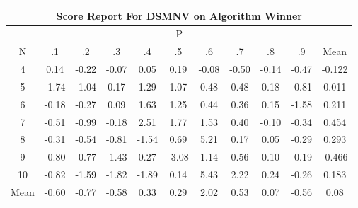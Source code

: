 \documentclass[11pt,a4paper]{report}
\begin{document}
\begin{longtable}{ | c || c | c | c | c | c | c | c | c | c || c |}
\hline
\multicolumn{11}{|c|}{ Score Report For DSMNV on Algorithm Winner} \\
\hline
\multicolumn{11}{|c|}{ P } \\
\hline
N & .1 & .2 & .3 & .4 & .5 & .6 & .7 & .8 & .9 & Mean\\
 \hline
 \hline
 \endhead
  4 &  \cellcolor[HTML]{FFFFFF} 0.14 &  \cellcolor[HTML]{FFF7F7} -0.22 &  \cellcolor[HTML]{FFFFFF} -0.07 &  \cellcolor[HTML]{FFFFFF} 0.05 &  \cellcolor[HTML]{F7F7FF} 0.19 &  \cellcolor[HTML]{FFFFFF} -0.08 &  \cellcolor[HTML]{FFEFEF} -0.50 &  \cellcolor[HTML]{FFFFFF} -0.14 &  \cellcolor[HTML]{FFF7F7} -0.47 & -0.122 \\
  5 &  \cellcolor[HTML]{FFD7D7} -1.74 &  \cellcolor[HTML]{FFE7E7} -1.04 &  \cellcolor[HTML]{F7F7FF} 0.17 &  \cellcolor[HTML]{DFDFFF} 1.29 &  \cellcolor[HTML]{E7E7FF} 1.07 &  \cellcolor[HTML]{EFEFFF} 0.48 &  \cellcolor[HTML]{EFEFFF} 0.48 &  \cellcolor[HTML]{F7F7FF} 0.18 &  \cellcolor[HTML]{FFE7E7} -0.81 & 0.011 \\
  6 &  \cellcolor[HTML]{FFF7F7} -0.18 &  \cellcolor[HTML]{FFF7F7} -0.27 &  \cellcolor[HTML]{FFFFFF} 0.09 &  \cellcolor[HTML]{D7D7FF} 1.63 &  \cellcolor[HTML]{DFDFFF} 1.25 &  \cellcolor[HTML]{F7F7FF} 0.44 &  \cellcolor[HTML]{F7F7FF} 0.36 &  \cellcolor[HTML]{FFFFFF} 0.15 &  \cellcolor[HTML]{FFD7D7} -1.58 & 0.211 \\
  7 &  \cellcolor[HTML]{FFEFEF} -0.51 &  \cellcolor[HTML]{FFE7E7} -0.99 &  \cellcolor[HTML]{FFF7F7} -0.18 &  \cellcolor[HTML]{BFBFFF} 2.51 &  \cellcolor[HTML]{CFCFFF} 1.77 &  \cellcolor[HTML]{D7D7FF} 1.53 &  \cellcolor[HTML]{F7F7FF} 0.40 &  \cellcolor[HTML]{FFFFFF} -0.10 &  \cellcolor[HTML]{FFF7F7} -0.34 & 0.454 \\
  8 &  \cellcolor[HTML]{FFF7F7} -0.31 &  \cellcolor[HTML]{FFEFEF} -0.54 &  \cellcolor[HTML]{FFE7E7} -0.81 &  \cellcolor[HTML]{FFD7D7} -1.54 &  \cellcolor[HTML]{EFEFFF} 0.69 &  \cellcolor[HTML]{8080FF} 5.21 &  \cellcolor[HTML]{F7F7FF} 0.17 &  \cellcolor[HTML]{FFFFFF} 0.05 &  \cellcolor[HTML]{FFF7F7} -0.29 & 0.293 \\
  9 &  \cellcolor[HTML]{FFE7E7} -0.80 &  \cellcolor[HTML]{FFEFEF} -0.77 &  \cellcolor[HTML]{FFD7D7} -1.43 &  \cellcolor[HTML]{F7F7FF} 0.27 &  \cellcolor[HTML]{FFAFAF} -3.08 &  \cellcolor[HTML]{DFDFFF} 1.14 &  \cellcolor[HTML]{EFEFFF} 0.56 &  \cellcolor[HTML]{FFFFFF} 0.10 &  \cellcolor[HTML]{FFF7F7} -0.19 & -0.466 \\
  10 &  \cellcolor[HTML]{FFE7E7} -0.82 &  \cellcolor[HTML]{FFD7D7} -1.59 &  \cellcolor[HTML]{FFCFCF} -1.82 &  \cellcolor[HTML]{FFCFCF} -1.89 &  \cellcolor[HTML]{FFFFFF} 0.14 &  \cellcolor[HTML]{7878FF} 5.43 &  \cellcolor[HTML]{C7C7FF} 2.22 &  \cellcolor[HTML]{F7F7FF} 0.24 &  \cellcolor[HTML]{FFF7F7} -0.26 & 0.183 \\
 \hline
 \hline
Mean &  \cellcolor[HTML]{FFEFEF} -0.60 &  \cellcolor[HTML]{FFEFEF} -0.77 &  \cellcolor[HTML]{FFEFEF} -0.58 &  \cellcolor[HTML]{F7F7FF} 0.33 &  \cellcolor[HTML]{F7F7FF} 0.29 &  \cellcolor[HTML]{CFCFFF} 2.02 &  \cellcolor[HTML]{EFEFFF} 0.53 &  \cellcolor[HTML]{FFFFFF} 0.07 &  \cellcolor[HTML]{FFEFEF} -0.56 &  \cellcolor[HTML]{FFFFFF} 0.08
\end{longtable}
\end{document}
